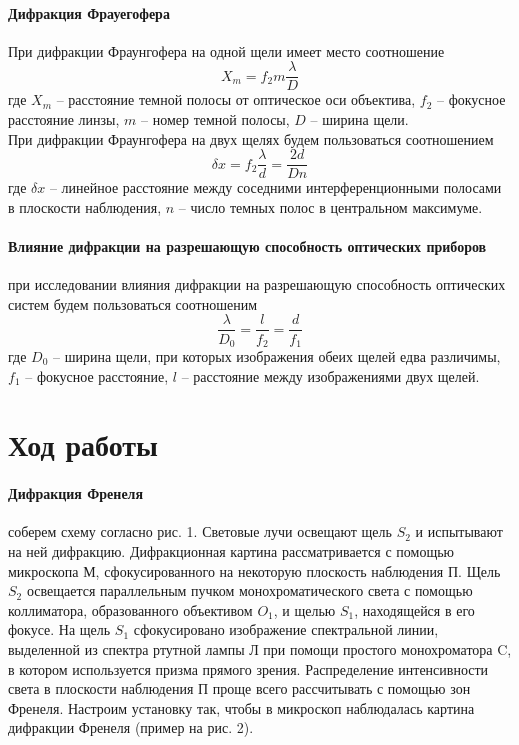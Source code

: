 \documentclass[a4paper,12pt]{article}
\begin{document}
\paragraph{Дифракция Фрауегофера}
При дифракции Фраунгофера на одной щели имеет место соотношение
\begin{equation}
    X_m = f_2 m \frac{\lambda}{D}
\end{equation}
где $X_m$ -- расстояние темной полосы от оптическое оси объектива, $f_2$ -- фокусное расстояние линзы, $m$ -- номер темной полосы, $D$ -- ширина щели. \\
При дифракции Фраунгофера на двух щелях будем пользоваться соотношением 
\begin{equation}
    \delta x = f_2 \frac{\lambda}{d} = \frac{2d}{Dn}
\end{equation}
где $\delta x$ -- линейное расстояние между соседними интерференционными полосами в плоскости наблюдения, $n$ -- число темных полос в центральном максимуме.

\paragraph{Влияние дифракции на разрешающую способность оптических приборов} при исследовании влияния дифракции на разрешающую способность оптических систем будем пользоваться соотношеним 
\begin{equation}
    \frac{\lambda}{D_0} = \frac{l}{f_2} = \frac{d}{f_1}
\end{equation}
где $D_0$ -- ширина щели, при которых изображения обеих щелей едва различимы, $f_1$ -- фокусное расстояние, $l$ -- расстояние между изображениями двух щелей.


\section*{Ход работы}
\paragraph{Дифракция Френеля} соберем схему согласно рис. 1. Световые лучи освещают щель $ S_2 $ и испытывают на ней дифракцию. Дифракционная картина рассматривается с помощью микроскопа М, сфокусированного на некоторую плоскость наблюдения П. Щель $ S_2 $ освещается параллельным пучком монохроматического света с помощью коллиматора, образованного объективом $ O_1 $, и щелью $S_1$, находящейся в его фокусе. На щель $ S_1 $ сфокусировано изображение спектральной линии, выделенной из спектра ртутной лампы Л при помощи простого монохроматора C, в котором используется призма прямого зрения. Распределение интенсивности света в плоскости наблюдения П проще всего рассчитывать с помощью зон Френеля. Настроим установку так, чтобы в микроскоп наблюдалась картина дифракции Френеля (пример на рис. 2).
\end{document}
